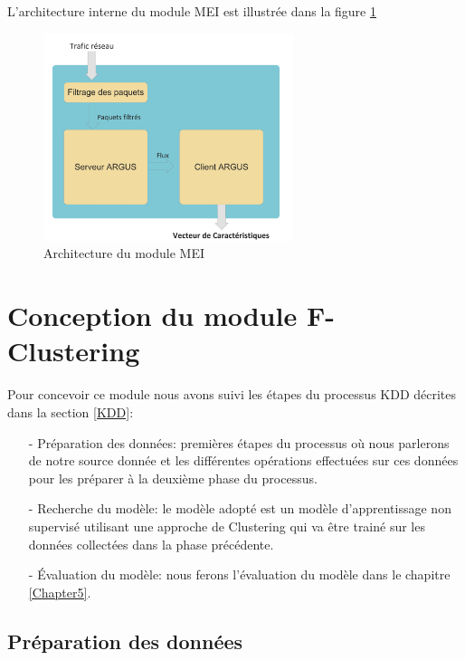 L'architecture interne du module MEI est illustrée dans la figure \ref{fig:MEI}
\begin{figure}[h]
\centering
\includegraphics[width=0.65\textwidth]{Figures/MEI}
\decoRule
\caption{Architecture du module MEI}
\label{fig:MEI}
\end{figure} 

\newpage
\section{Conception du module F-Clustering}
\label{F-Clustering}
Pour concevoir ce module nous avons suivi les étapes du processus KDD décrites dans la section \ref{KDD}:\\
\begin{itemize}
\item[-] Préparation des données: premières étapes du processus où nous parlerons de notre source donnée et les différentes opérations effectuées sur ces données pour les préparer à la deuxième phase du processus. \\
\item[-] Recherche du modèle: le modèle adopté est un modèle d'apprentissage non supervisé utilisant une approche de Clustering qui va être trainé sur les données collectées dans la phase précédente.\\
\item[-] Évaluation du modèle: nous ferons l'évaluation du modèle dans le chapitre \ref{Chapter5}.
\end{itemize}

\subsection{Préparation des données}
